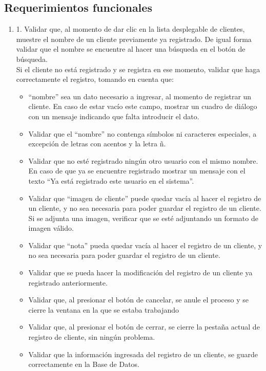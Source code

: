 \documentclass[a4paper,DIV=12]{scrreprt}
\begin{document}
\subsection*{Requerimientos funcionales}
\begin{enumerate}
	
	\item{1.	Validar que, al momento de dar clic en la lista desplegable de clientes, muestre el nombre de un cliente previamente ya registrado. De igual forma validar que el nombre se encuentre al hacer una búsqueda en el botón de búsqueda.\\ 
Si el cliente no está registrado y se registra en ese momento, validar que haga correctamente el registro, tomando en cuenta que: 
\\}
	    \begin{itemize}
	 \item{“nombre” sea un dato necesario a ingresar, al momento de registrar un cliente. En caso de estar vacío este campo, mostrar un cuadro de diálogo con un mensaje indicando que falta introducir el dato. \\}
    \item{Validar que el “nombre” no contenga símbolos ni caracteres especiales, a excepción de letras con acentos y la letra ñ. \\}
    \item{Validar que no esté registrado ningún otro usuario con el mismo nombre. En caso de que ya se encuentre registrado mostrar un mensaje con el texto “Ya está registrado este usuario en el sistema”.\\}
    \item{Validar que “imagen de cliente” puede quedar vacía al hacer el registro de un cliente, y no sea necesaria para poder guardar el registro de un cliente. Si se adjunta una imagen, verificar que se esté adjuntando un formato de imagen válido.\\}
    \item{Validar que “nota” pueda quedar vacía al hacer el registro de un cliente, y no sea necesaria para poder guardar el registro de un cliente. \\}
    \item{Validar que se pueda hacer la modificación del registro de un cliente ya registrado anteriormente.\\}
    \item{Validar que, al presionar el botón de cancelar, se anule el proceso y se cierre la ventana en la que se estaba trabajando\\}
    \item{Validar que, al presionar el botón de cerrar, se cierre la pestaña actual de registro de cliente, sin ningún problema. \\}
    \item{Validar que la información ingresada del registro de un cliente, se guarde correctamente en la Base de Datos. \\}
	         

\end{itemize}
\end{enumerate}
\end{document}
